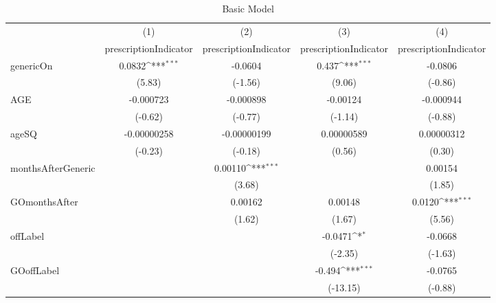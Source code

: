 \begin{table}[htbp]\centering
\def\sym#1{\ifmmode^{#1}\else\(^{#1}\)\fi}
\caption{Basic Model\label{tab1}}
\begin{tabular}{l*{4}{c}}
\hline\hline
            &\multicolumn{1}{c}{(1)}&\multicolumn{1}{c}{(2)}&\multicolumn{1}{c}{(3)}&\multicolumn{1}{c}{(4)}\\
            &\multicolumn{1}{c}{prescriptionIndicator}&\multicolumn{1}{c}{prescriptionIndicator}&\multicolumn{1}{c}{prescriptionIndicator}&\multicolumn{1}{c}{prescriptionIndicator}\\
\hline
genericOn   &      0.0832\sym{***}&     -0.0604         &       0.437\sym{***}&     -0.0806         \\
            &      (5.83)         &     (-1.56)         &      (9.06)         &     (-0.86)         \\
[1em]
AGE         &   -0.000723         &   -0.000898         &    -0.00124         &   -0.000944         \\
            &     (-0.62)         &     (-0.77)         &     (-1.14)         &     (-0.88)         \\
[1em]
ageSQ       & -0.00000258         & -0.00000199         &  0.00000589         &  0.00000312         \\
            &     (-0.23)         &     (-0.18)         &      (0.56)         &      (0.30)         \\
[1em]
monthsAfterGeneric&                     &     0.00110\sym{***}&                     &     0.00154         \\
            &                     &      (3.68)         &                     &      (1.85)         \\
[1em]
GOmonthsAfter&                     &     0.00162         &     0.00148         &      0.0120\sym{***}\\
            &                     &      (1.62)         &      (1.67)         &      (5.56)         \\
[1em]
offLabel    &                     &                     &     -0.0471\sym{*}  &     -0.0668         \\
            &                     &                     &     (-2.35)         &     (-1.63)         \\
[1em]
GOoffLabel  &                     &                     &      -0.494\sym{***}&     -0.0765         \\
            &                     &                     &    (-13.15)         &     (-0.88)         \\

\end{tabular}
\end{table}
